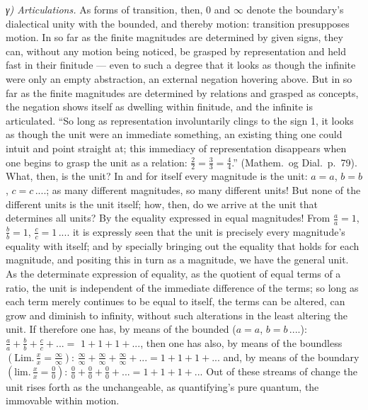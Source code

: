 \documentclass[12pt,a4paper]{book}
\begin{document}
\emph{γ) Articulations.} As forms of transition, then, $0$ and $\infty$ denote
the boundary's dialectical unity with the
bounded, and thereby motion: transition presupposes motion. In so far as the
finite magnitudes are determined by given signs, they can, without any motion
being noticed, be grasped by representation and held fast in their finitude ---
even to such a degree that it looks as though the infinite were only an empty
abstraction, an external negation hovering above. But in so far as the finite
magnitudes are determined by relations and grasped as concepts, the negation
shows itself as dwelling within finitude, and the infinite is articulated. ``So
long as representation involuntarily clings to the sign 1, it looks as though
the unit were an immediate something, an existing thing one could intuit and
point straight at; this immediacy of representation disappears when one begins
to grasp the unit as a relation: $\frac{2}{2} = \frac{3}{3} = \frac{4}{4}$.''
(Mathem.\ og Dial.\ p.~79). What, then, is the unit? In and for itself every
magnitude is the unit: $a = a$, $b = b$, $c = c\,....$; as many different
magnitudes, so many different units! But none of the different units is the
unit itself; how, then, do we arrive at the unit that determines all units? By
the equality expressed in equal magnitudes! From $\frac{a}{a} = 1$,
$\frac{b}{b} = 1$, $\frac{c}{c} = 1\,....$ it is expressly seen that the unit
is precisely every magnitude's equality with itself; and by specially bringing
out the equality that holds for each magnitude, and positing this in turn as a
magnitude, we have the general unit. As the determinate expression of equality,
as the quotient of equal terms of a ratio, the unit is independent of the
immediate difference of the terms; so long as each term merely continues to be
equal to itself, the terms can be altered, can grow and diminish to infinity,
without such alterations in the least altering the unit. If therefore one has,
by means of the bounded ($a = a$, $b = b\,....$): $\frac{a}{a} + \frac{b}{b} +
\frac{c}{c} + ... =$
$1 + 1 + 1 + ...$, then one has also, by means of the boundless
$\left(\mathrm{Lim.}\,\frac{x}{x} = \frac{\infty}{\infty}\right)$:
$\frac{\infty}{\infty} + \frac{\infty}{\infty} + \frac{\infty}{\infty}
+ ... = 1 + 1 + 1 + ...$ and, by means of the boundary
$\left(\mathrm{lim.}\,\frac{x}{x} = \frac{0}{0}\right)$: $\frac{0}{0} +
\frac{0}{0} + \frac{0}{0} + ... = 1 + 1 + 1 + ...$ Out of these streams of
change the unit rises forth as the unchangeable, as quantifying's pure quantum,
the immovable within motion.
\end{document}
